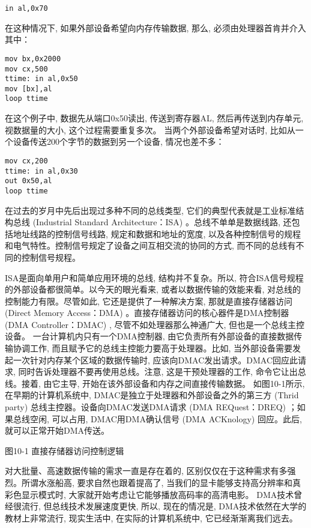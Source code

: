 \documentclass[12pt]{article}
\begin{document}
\begin{CJK}{UTF8}{gbsn}
\begin{verbatim}
in al,0x70
\end{verbatim}

在这种情况下, 如果外部设备希望向内存传输数据, 那么, 必须由处理器首肯并介入其中：
\begin{verbatim}
mov bx,0x2000
mov cx,500
ttime: in al,0x50
mov [bx],al
loop ttime
\end{verbatim}
在这个例子中, 数据先从端口0x50读出, 传送到寄存器AL, 然后再传送到内存单元, 视数据量的大小, 这个过程需要重复多次。
当两个外部设备希望对话时, 比如从一个设备传送200个字节的数据到另一个设备, 情况也差不多：

\begin{verbatim}
mov cx,200
ttime: in al,0x30
out 0x50,al
loop ttime
\end{verbatim}

在过去的岁月中先后出现过多种不同的总线类型, 它们的典型代表就是工业标准结构总线 (Industrial Standard Architecture：ISA) 。总线不单单是数据线路, 还包括地址线路的控制信号线路, 规定和数据和地址的宽度, 以及各种控制信号的规程和电气特性。控制信号规定了设备之间互相交流的协同的方式, 而不同的总线有不同的控制信号规程。

ISA是面向单用户和简单应用环境的总线, 结构并不复杂。所以, 符合ISA信号规程的外部设备都很简单。以今天的眼光看来, 或者以数据传输的效能来看, 对总线的控制能力有限。尽管如此, 它还是提供了一种解决方案, 那就是直接存储器访问 (Direct Memory Access：DMA) 。直接存储器访问的核心器件是DMA控制器 (DMA Controller：DMAC) , 尽管不如处理器那么神通广大, 但也是一个总线主控设备。
一台计算机内只有一个DMA控制器, 由它负责所有外部设备的直接数据传输协调工作, 而且赋予它的总线主控能力要高于处理器。比如, 当外部设备需要发起一次针对内存某个区域的数据传输时, 应该向DMAC发出请求。DMAC回应此请求, 同时告诉处理器不要再使用总线。注意, 这是干预处理器的工作, 命令它让出总线。接着, 由它主导, 开始在该外部设备和内存之间直接传输数据。
如图10-1所示, 在早期的计算机系统中, DMAC是独立于处理器和外部设备之外的第三方 (Thrid party) 总线主控器。设备向DMAC发送DMA请求 (DMA REQuest：DREQ) ；如果总线空闲, 可以占用, DMAC用DMA确认信号 (DMA ACKnology) 回应。此后, 就可以正常开始DMA传送。
 
图10-1  直接存储器访问控制逻辑

对大批量、高速数据传输的需求一直是存在着的, 区别仅仅在于这种需求有多强烈。所谓水涨船高, 要求自然也跟着提高了, 当我们的显卡能够支持高分辨率和真彩色显示模式时, 大家就开始考虑让它能够播放高码率的高清电影。
DMA技术曾经很流行, 但总线技术发展速度更快, 所以, 现在的情况是, DMA技术依然在大学的教材上非常流行, 现实生活中, 在实际的计算机系统中, 它已经渐渐离我们远去。


\end{CJK}
\end{document}
